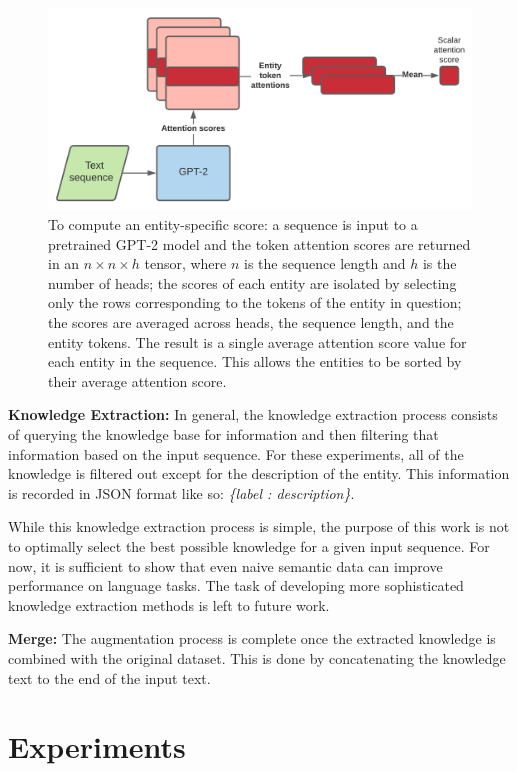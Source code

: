 \documentclass[phd,electronic,oneside,twosidetoc,letterpaper,chaptercenter,parttop,lof]{byumsphd}
\begin{document}
\begin{figure}
    \includegraphics[width=0.75\columnwidth]{images/ssm/attention_score_calculation.png}
    \centering
    \caption[Attention score calculation]{
        To compute an entity-specific score: a sequence is input to a pretrained GPT-2 model and the token attention scores are returned in an 
        $n\times n\times h$
        tensor, where $n$ is the sequence length and $h$ is the number of heads;   
        the scores of each entity are isolated by selecting only the rows corresponding to the tokens of the entity in question; the scores are averaged across heads, the sequence length, and the entity tokens.
        The result is a single average attention score value for each entity in the sequence. 
        This allows the entities to be sorted by their average attention score.
    }
    \label{fig:attention_scores}
\end{figure}

\textbf{Knowledge Extraction:}
In general, the knowledge extraction process consists of querying the knowledge base for information and then filtering that information based on the input sequence. 
For these experiments, all of the knowledge is filtered out except for the description of the entity. 
This information is recorded in JSON format like so: \emph{\{label : description\}}.

While this knowledge extraction process is simple, the purpose of this work is not to optimally select the best possible knowledge for a given input sequence. 
For now, it is sufficient to show that even naive semantic data can improve performance on language tasks.
The task of developing more sophisticated knowledge extraction methods is left to future work.

\textbf{Merge:}
The augmentation process is complete once the extracted knowledge is combined with the original dataset. 
This is done by concatenating the knowledge text to the end of the input text.
        
    
\section{Experiments}
\end{document}
